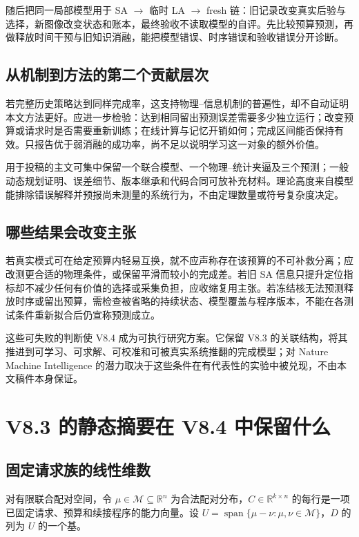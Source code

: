 \documentclass[11pt,a4paper,fontset=fandol]{ctexart}
\theoremstyle{definition}
\theoremstyle{remark}
\numberwithin{equation}{section}
\newcommand{\R}{\mathbb R}
\newcommand{\Span}{\operatorname{span}}
\begin{document}
随后把同一局部模型用于 SA $\to$ 临时 LA $\to$ fresh 链：旧记录改变真实后验与选择，新图像改变状态和账本，最终验收不读取模型的自评。先比较预算预测，再做释放时间干预与旧知识消融，能把模型错误、时序错误和验收错误分开诊断。

\subsection{从机制到方法的第二个贡献层次}
若完整历史策略达到同样完成率，这支持物理--信息机制的普遍性，却不自动证明本文方法更好。应进一步检验：达到相同留出预测误差需要多少独立运行；改变预算或请求时是否需要重新训练；在线计算与记忆开销如何；完成区间能否保持有效。只报告优于弱消融的成功率，尚不足以说明学习这一对象的额外价值。

用于投稿的主文可集中保留一个联合模型、一个物理--统计夹逼及三个预测；一般动态规划证明、误差细节、版本继承和代码合同可放补充材料。理论高度来自模型能排除错误解释并预报尚未测量的系统行为，不由定理数量或符号复杂度决定。

\subsection{哪些结果会改变主张}
若真实模式可在给定预算内轻易互换，就不应声称存在该预算的不可补救分离；应改测更合适的物理条件，或保留平滑而较小的完成差。若旧 SA 信息只提升定位指标却不减少任何有价值的选择或采集负担，应收缩复用主张。若冻结核无法预测释放时序或留出预算，需检查被省略的持续状态、模型覆盖与程序版本，不能在各测试条件重新拟合后仍宣称预测成立。

这些可失败的判断使 V8.4 成为可执行研究方案。它保留 V8.3 的关联结构，将其推进到可学习、可求解、可校准和可被真实系统推翻的完成模型；对 Nature Machine Intelligence 的潜力取决于这些条件在有代表性的实验中被兑现，不由本文稿件本身保证。

\appendix
\section{V8.3 的静态摘要在 V8.4 中保留什么}
\label{app:rank}
\subsection{固定请求族的线性维数}
对有限联合配对空间，令 $\mu\in\mathcal M\subseteq\R^n$ 为合法配对分布，$C\in\R^{k\times n}$ 的每行是一项已固定请求、预算和续接程序的能力向量。设 $U=\Span\{\mu-\nu:\mu,\nu\in\mathcal M\}$，$D$ 的列为 $U$ 的一个基。
\end{document}
